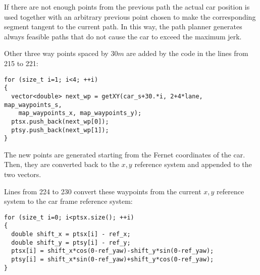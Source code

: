 \documentclass{article}
\begin{document}
If there are not enough points from the previous path the actual car position is used together with an arbitrary previous point chosen to make the corresponding segment tangent to the current path. In this way, the path planner generates always feasible paths that do not cause the car to exceed the maximum jerk.

Other three way points spaced by $30m$ are added by the code in the lines from 215 to 221:
\begin{lstlisting}
for (size_t i=1; i<4; ++i)
{
  vector<double> next_wp = getXY(car_s+30.*i, 2+4*lane, map_waypoints_s,
    map_waypoints_x, map_waypoints_y);
  ptsx.push_back(next_wp[0]);
  ptsy.push_back(next_wp[1]);
}
\end{lstlisting}
The new points are generated starting from the Fernet coordinates of the car. Then, they are converted back to the $x,y$ reference system and appended to the two vectors.

Lines from 224 to 230 convert these waypoints from the current $x,y$ reference system to the car frame reference system:
\begin{lstlisting}
for (size_t i=0; i<ptsx.size(); ++i)
{
  double shift_x = ptsx[i] - ref_x;
  double shift_y = ptsy[i] - ref_y;
  ptsx[i] = shift_x*cos(0-ref_yaw)-shift_y*sin(0-ref_yaw);
  ptsy[i] = shift_x*sin(0-ref_yaw)+shift_y*cos(0-ref_yaw);
}
\end{lstlisting}
\end{document}
